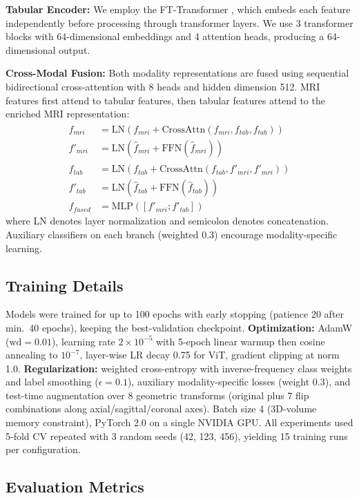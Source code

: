 \documentclass[conference]{IEEEtran}
\begin{document}
\textbf{Tabular Encoder:} We employ the FT-Transformer \cite{gorishniy2021}, which embeds each feature independently before processing through transformer layers. We use 3 transformer blocks with 64-dimensional embeddings and 4 attention heads, producing a 64-dimensional output.

\textbf{Cross-Modal Fusion:} Both modality representations are fused using sequential bidirectional cross-attention with 8 heads and hidden dimension 512. MRI features first attend to tabular features, then tabular features attend to the enriched MRI representation:
\begin{align}
\hat{f}_{mri} &= \text{LN}(f_{mri} + \text{CrossAttn}(f_{mri}, f_{tab}, f_{tab})) \\
f'_{mri} &= \text{LN}(\hat{f}_{mri} + \text{FFN}(\hat{f}_{mri})) \\
\hat{f}_{tab} &= \text{LN}(f_{tab} + \text{CrossAttn}(f_{tab}, f'_{mri}, f'_{mri})) \\
f'_{tab} &= \text{LN}(\hat{f}_{tab} + \text{FFN}(\hat{f}_{tab})) \\
f_{fused} &= \text{MLP}([f'_{mri}; f'_{tab}])
\end{align}
where LN denotes layer normalization and semicolon denotes concatenation. Auxiliary classifiers on each branch (weighted 0.3) encourage modality-specific learning.

\subsection{Training Details}

Models were trained for up to 100 epochs with early stopping (patience 20 after min.\ 40 epochs), keeping the best-validation checkpoint. \textbf{Optimization:} AdamW ($\mathrm{wd}{=}0.01$), learning rate $2\!\times\!10^{-5}$ with 5-epoch linear warmup then cosine annealing to $10^{-7}$, layer-wise LR decay 0.75 for ViT, gradient clipping at norm 1.0. \textbf{Regularization:} weighted cross-entropy with inverse-frequency class weights and label smoothing ($\epsilon{=}0.1$), auxiliary modality-specific losses (weight 0.3), and test-time augmentation over 8 geometric transforms (original plus 7 flip combinations along axial/sagittal/coronal axes). Batch size 4 (3D-volume memory constraint), PyTorch 2.0 on a single NVIDIA GPU. All experiments used 5-fold CV repeated with 3 random seeds (42, 123, 456), yielding 15 training runs per configuration.

\subsection{Evaluation Metrics}
\end{document}
